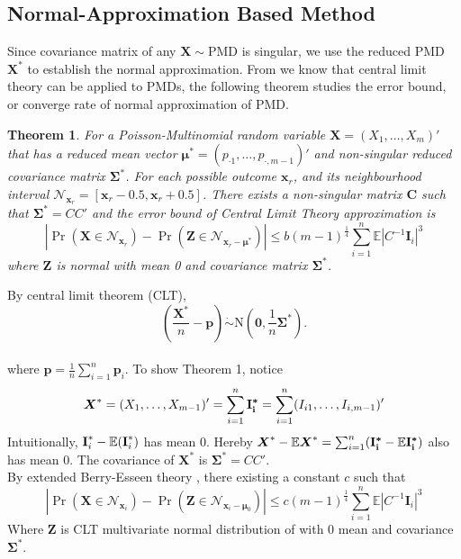 \documentclass[12pt]{article}
\newcommand{\zerovec}{{\boldsymbol{0}}}
\newcommand{\EE}{\mathbb{E}}
\newcommand{\Xmat}{\mathbf{X}}
\newcommand{\pvec}{\boldsymbol{p}}
\newcommand{\N}{\textrm{N}}
\newcommand{\PMD}{\textrm{PMD}}
\newcommand{\Xvec}{\boldsymbol{X}}
\newcommand{\Sig}{\boldsymbol{\Sigma}}
\newcommand{\mvec}{\boldsymbol{\mu}}
\newtheorem{thm}{Theorem}
\begin{document}
\subsection{Normal-Approximation Based Method}
Since covariance matrix of any $\Xvec \sim \PMD$ is singular, we use the reduced $\PMD$ $\Xvec^{\ast}$ to establish the normal approximation. From   we know that central limit theory can be applied to $\PMD$s, the following theorem studies the error bound, or converge rate of normal approximation of $\PMD$.
\begin{thm}
For a Poisson-Multinomial random variable $\Xmat = (X_1,\dots,X_{m})'$ that has a reduced mean vector $\mvec^{\ast} = \left( p_{\cdot1} ,\dots,p_{\cdot,m-1}\right)'$ and non-singular reduced covariance matrix $\Sig^{\ast}$. For each possible outcome $\boldsymbol{\boldsymbol{x}}_r$, and its neighbourhood interval $\mathcal{N}_{\boldsymbol{\boldsymbol{x}}_r} = [\boldsymbol{\boldsymbol{x}}_r-0.5,\boldsymbol{\boldsymbol{x}}_r+0.5]$. There exists a non-singular matrix $\boldsymbol{C}$ such that $\Sig^{\ast} = CC'$ and the error bound of Central Limit Theory approximation is
\begin{equation*}
    |\Pr(\Xmat \in \mathcal{N}_{\boldsymbol{x}_r}) - \Pr(\boldsymbol{Z} \in \mathcal{N}_{\boldsymbol{x}_r-\mvec^{\ast}})| \leq b (m-1)^{\frac{1}{4}} \sum_{i=1}^{n}\EE|C^{-1}\boldsymbol{I}_{i}|^3
\end{equation*}
where $\boldsymbol{Z}$ is normal with mean 0 and covariance matrix $\Sig^{\ast}$.
\end{thm}
By central limit theorem (CLT),
$$\left(\frac{\Xvec^{\ast}}{n}-\pvec\right)\dot\sim \N\left(\zerovec, \frac{1}{n}\Sig^{\ast}\right).$$\\
where $\pvec = \frac{1}{n}\sum_{i=1}^{n}\pvec_i$.
To show Theorem 1, notice
\begin{align*}
    \Xvec^{\ast} = (X_1,\dots,X_{m-1})' = \sum_{i=1}^{n} \boldsymbol{\rm{I}_{i}^{\ast}}= \sum_{i=1}^{n} (I_{i1},\dots,I_{i,m-1})'
\end{align*}
Intuitionally, $\boldsymbol{\rm{I}}_i^{\ast} - \EE(\boldsymbol{\rm{I}}_i^{\ast})$ has mean 0. Hereby $\Xvec^{\ast} - \EE \Xvec^{\ast} = \sum_{i=1}^{n} (\boldsymbol{\rm{I}_i^{\ast}} - \EE \boldsymbol{\rm I_{i}^{\ast}})$ also has mean 0. The covariance of $\Xvec^{\ast}$ is $\Sig^{\ast} = CC'$.\\
By extended Berry-Esseen theory \cite{raivc2019multivariate}, there existing  a constant $c$ such that
\begin{equation*}
    |\Pr\left(\Xmat \in \mathcal{N}_{\boldsymbol{x}_i}\right) - \Pr\left(\boldsymbol{Z} \in \mathcal{N}_{\boldsymbol{x}_i-\boldsymbol{\mu}_0} \right)| \leq c(m-1)^{\frac{1}{4}}\sum_{i=1}^{n} \EE \left|C^{-1}\boldsymbol{I}_i\right|^3
\end{equation*}
Where $\boldsymbol{Z}$ is CLT multivariate normal distribution of with 0 mean and covariance $\Sig^{\ast}$.
\end{document}
